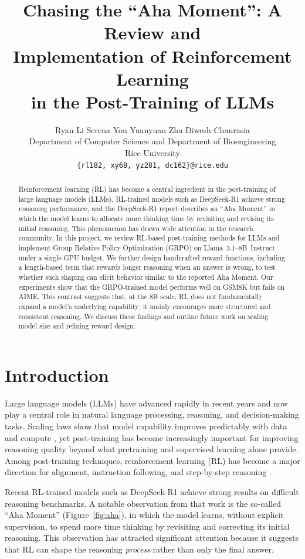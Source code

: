 \documentclass{article}
\title{Chasing the ``Aha Moment'': A Review and\\
Implementation of Reinforcement Learning\\
in the Post-Training of LLMs}
\author{%
  Ryan Li \quad Serena You \quad Yuanyuan Zhu \quad Diwesh Chaurasia \\[4pt]
  Department of Computer Science and Department of Bioengineering\\
  Rice University\\
  \texttt{\{rl182, xy68, yz281, dc162\}@rice.edu}
}
\begin{document}
\maketitle

\begin{abstract}
Reinforcement learning (RL) has become a central ingredient in the post-training of large language models (LLMs). RL-trained models such as DeepSeek-R1 achieve strong reasoning performance, and the DeepSeek-R1 report describes an ``Aha Moment'' in which the model learns to allocate more thinking time by revisiting and revising its initial reasoning. This phenomenon has drawn wide attention in the research community.
In this project, we review RL-based post-training methods for LLMs and implement Group Relative Policy Optimization (GRPO) on Llama~3.1--8B~Instruct under a single-GPU budget. We further design handcrafted reward functions, including a length-based term that rewards longer reasoning when an answer is wrong, to test whether such shaping can elicit behavior similar to the reported Aha Moment.
Our experiments show that the GRPO-trained model performs well on GSM8K but fails on AIME. This contrast suggests that, at the 8B scale, RL does not fundamentally expand a model's underlying capability; it mainly encourages more structured and consistent reasoning. We discuss these findings and outline future work on scaling model size and refining reward design.
\end{abstract}

\section{Introduction}

Large language models (LLMs) have advanced rapidly in recent years and now play a central role in natural language processing, reasoning, and decision-making tasks. Scaling laws show that model capability improves predictably with data and compute \cite{kaplan2020scaling, hoffmann2022chinchilla}, yet post-training has become increasingly important for improving reasoning quality beyond what pretraining and supervised learning alone provide. Among post-training techniques, reinforcement learning (RL) has become a major direction for alignment, instruction following, and step-by-step reasoning \cite{ouyang2022rlhf, ziegler2019fine}.

Recent RL-trained models such as DeepSeek-R1 \cite{deepseekr1} achieve strong results on difficult reasoning benchmarks. A notable observation from that work is the so-called ``Aha Moment'' (Figure~\ref{fig:aha}), in which the model learns, without explicit supervision, to spend more time thinking by revisiting and correcting its initial reasoning. This observation has attracted significant attention because it suggests that RL can shape the reasoning \emph{process} rather than only the final answer.
\end{document}
